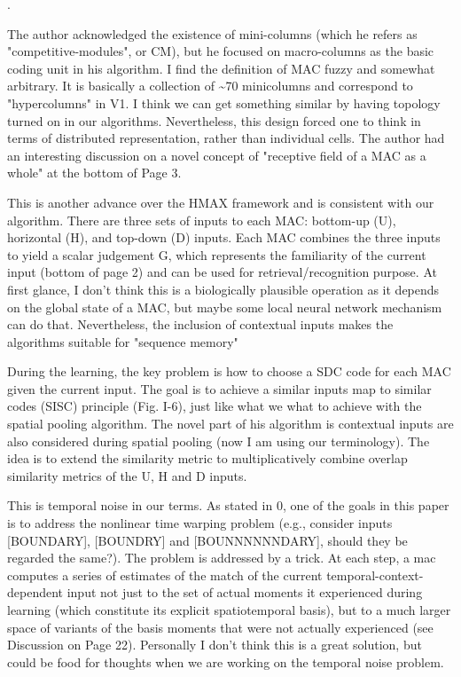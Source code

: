 \documentclass{article} %
\begin{document}
.

The author acknowledged the existence of
mini-columns
(which he refers as "competitive-modules", or CM), but he focused on
macro-columns as the basic coding unit in his algorithm. I find the definition
of MAC fuzzy and somewhat arbitrary. It is basically a collection of \~{}70
minicolumns and correspond to "hypercolumns" in V1. I think we can get something
similar by having topology turned on in our algorithms. Nevertheless, this
design forced one to think in terms of distributed representation, rather than
individual cells. The author had an interesting discussion on a novel concept of
"receptive field of a MAC as a whole" at the bottom of Page 3.


This
is another
advance over the HMAX framework and is consistent with our algorithm. There are
three sets of inputs to each MAC: bottom-up (U), horizontal (H), and top-down
(D) inputs. Each MAC combines the three inputs to yield a scalar judgement G,
which represents the familiarity of the current input (bottom of page 2) and can
be used for retrieval/recognition purpose. At first glance, I don't think this
is a biologically plausible operation as it depends on the global state of a
MAC, but maybe some local neural network mechanism can do that. Nevertheless,
the inclusion of contextual inputs makes the algorithms suitable for "sequence
memory"


During the learning, the key problem is
 how to
choose a SDC code for each MAC given the current input. The goal is to achieve a
similar inputs map to similar codes (SISC) principle (Fig. I-6), just like what
we what to achieve with the spatial pooling algorithm. The novel part of his
algorithm is contextual inputs are also considered during spatial pooling (now I
am using our terminology). The idea is to extend the similarity metric to
multiplicatively combine overlap similarity metrics of the U, H and D inputs.


This is temporal noise in our
terms. As
stated in 0, one of the goals in this paper is to address the nonlinear time
warping problem (e.g., consider inputs [BOUNDARY], [BOUNDRY] and
[BOUNNNNNNDARY], should they be regarded the same?). The problem is addressed by
a trick. At each step, a mac computes a series of estimates of the match of the
current temporal-context-dependent input not just to the set of actual moments
it experienced during learning (which constitute its explicit spatiotemporal
basis), but to a much larger space of variants of the basis moments that were
not actually experienced (see Discussion on Page 22). Personally I don't think
this is a great solution, but could be food for thoughts when we are working on
the temporal noise problem.



%

\end{document}
